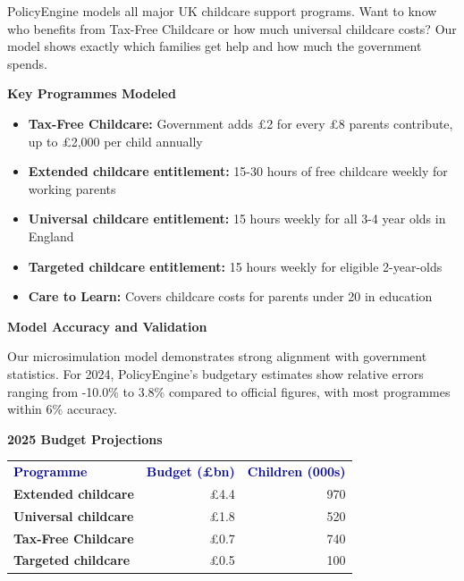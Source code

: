 \documentclass[a4paper,11pt]{article}
\begin{document}
PolicyEngine models all major UK childcare support programs. Want to know who benefits from Tax-Free Childcare or how much universal childcare costs? Our model shows exactly which families get help and how much the government spends.

\vspace{15pt}

\begin{tcolorbox}[
    colback=lightgray,
    colframe=mediumblue,
    rounded corners,
    leftrule=3mm,
    rightrule=0mm,
    toprule=0mm,
    bottomrule=0mm
]
\textbf{\color{darkblue}Key Programmes Modeled}

\begin{itemize}[leftmargin=15pt]
\item \textbf{Tax-Free Childcare:} Government adds £2 for every £8 parents contribute, up to £2,000 per child annually
\item \textbf{Extended childcare entitlement:} 15-30 hours of free childcare weekly for working parents
\item \textbf{Universal childcare entitlement:} 15 hours weekly for all 3-4 year olds in England
\item \textbf{Targeted childcare entitlement:} 15 hours weekly for eligible 2-year-olds
\item \textbf{Care to Learn:} Covers childcare costs for parents under 20 in education
\end{itemize}
\end{tcolorbox}

\vspace{15pt}

\textbf{Model Accuracy and Validation}

Our microsimulation model demonstrates strong alignment with government statistics. For 2024, PolicyEngine's budgetary estimates show relative errors ranging from -10.0\% to 3.8\% compared to official figures, with most programmes within 6\% accuracy.

\vspace{15pt}

\begin{tcolorbox}[
    colback=lightgray,
    colframe=mediumblue,
    rounded corners,
    leftrule=3mm,
    rightrule=0mm,
    toprule=0mm,
    bottomrule=0mm
]
\textbf{\color{darkblue}2025 Budget Projections}

\vspace{10pt}

\begin{tabular}{l r r}
\textcolor{darkblue}{\textbf{Programme}} & \textcolor{darkblue}{\textbf{Budget (£bn)}} & \textcolor{darkblue}{\textbf{Children (000s)}} \\[8pt]
\textbf{Extended childcare} & £4.4 & 970 \\
\textbf{Universal childcare} & £1.8 & 520 \\
\textbf{Tax-Free Childcare} & £0.7 & 740 \\
\textbf{Targeted childcare} & £0.5 & 100 \\
\end{tabular}
\end{tcolorbox}
\end{document}

